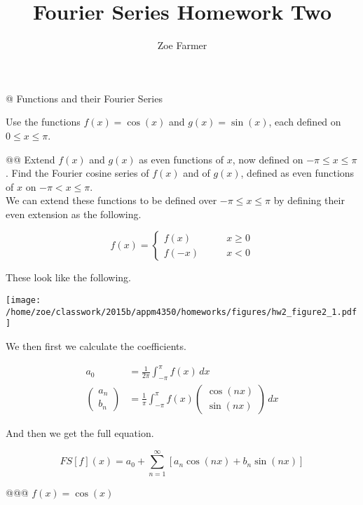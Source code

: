\documentclass[10pt]{article}
\title{Fourier Series Homework Two}
\author{Zoe Farmer}
\begin{document}
\maketitle

\begin{easylist}[enumerate]
    @ Functions and their Fourier Series

    Use the functions $f(x)=\cos(x)$ and $g(x)=\sin(x)$, each defined on $0 \le x \le \pi$.

    @@ Extend $f(x)$ and $g(x)$ as even functions of $x$, now defined on $-\pi \le x \le \pi$. Find the Fourier cosine
    series of $f(x)$ and of $g(x)$, defined as even functions of $x$ on $-\pi < x \le \pi$.\\

    We can extend these functions to be defined over $-\pi \le x \le \pi$ by defining their even extension as the
    following.

    \[
        f(x) = \begin{cases}
            f(x) \qquad &x \ge 0\\
            f(-x) \qquad &x < 0
        \end{cases}
    \]

    These look like the following.

\weave

\texttt{[image: /home/zoe/classwork/2015b/appm4350/homeworks/figures/hw2\_figure2\_1.pdf]}

\noweave

    We then first we calculate the coefficients.

    \begin{align*}
        a_0 &= \frac{1}{2\pi} \int_{-\pi}^\pi f(x) \, dx\\
            \left(\begin{array}{c}a_n\\b_n\end{array}\right) &= \frac{1}{\pi} \int_{-\pi}^\pi f(x)
            \left(\begin{array}{c}\cos(nx)\\\sin(nx)\end{array}\right) \, dx
    \end{align*}

    And then we get the full equation.

    \[
        FS[f](x) = a_0 + \sum_{n=1}^\infty \left[ a_n \cos(nx) + b_n \sin(nx) \right]
    \]

    @@@ $f(x) = \cos(x)$


\end{easylist}
\end{document}
